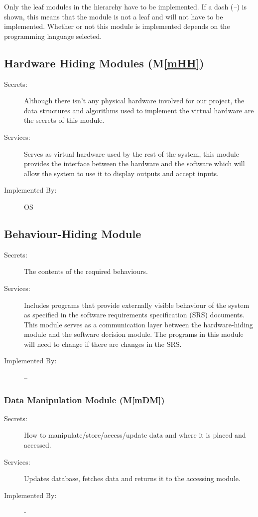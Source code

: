 \documentclass[12pt, titlepage]{article}
\newcommand{\mref}[1]{M\ref{#1}}
\begin{document}
Only the leaf modules in the
hierarchy have to be implemented. If a dash (\emph{--}) is shown, this means
that the module is not a leaf and will not have to be implemented. Whether or
not this module is implemented depends on the programming language
selected.

\subsection{Hardware Hiding Modules (\mref{mHH})}

\begin{description}
\item[Secrets:]Although there isn't any physical hardware involved for our project, the data structures and algorithms used to implement the virtual hardware are the secrets of this module.
\item[Services:]Serves as virtual hardware used by the rest of the system, this module provides the interface between the hardware and the software which will allow the system to use it to display outputs and accept inputs.
\item[Implemented By:] OS
\end{description}

\subsection{Behaviour-Hiding Module}

\begin{description}
\item[Secrets:]The contents of the required behaviours.
\item[Services:]Includes programs that provide externally visible behaviour of
  the system as specified in the software requirements specification (SRS)
  documents. This module serves as a communication layer between the
  hardware-hiding module and the software decision module. The programs in this
  module will need to change if there are changes in the SRS.
\item[Implemented By:] --
\end{description}


\subsubsection{Data Manipulation Module (\mref{mDM})}
\begin{description}
\item[Secrets:]How to manipulate/store/access/update data and where it is placed and accessed.
\item[Services:]Updates database, fetches data and returns it to the accessing module.
\item[Implemented By:] -
\end{description}
\end{document}
